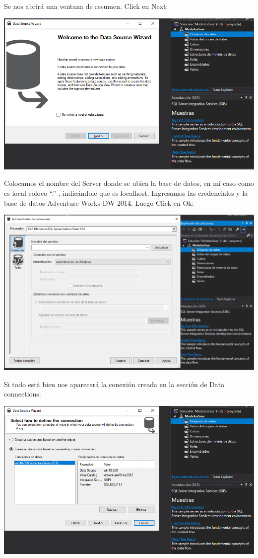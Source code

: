 Se nos abrirá una ventana de resumen. Click en Next:
	\begin{center}
	\includegraphics[width=\columnwidth]{images/task1/3}
	\end{center}	

Colocamos el nombre del Server donde se ubica la base de datos, en mi caso como es local coloco “.” , indicándole que es localhost. Ingresamos las credenciales y la base de datos Adventure Works DW 2014. Luego Click en Ok:
	\begin{center}
	\includegraphics[width=\columnwidth]{images/task1/4}
    \end{center}	
    
Si todo está bien nos aparecerá la conexión creada en la sección de Data connections:
	\begin{center}
	\includegraphics[width=\columnwidth]{images/task1/5}
    \end{center}	
    
